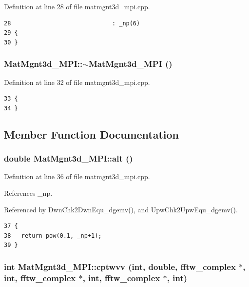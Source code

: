 Definition at line 28 of file matmgnt3d\_\-mpi.cpp.

\footnotesize\begin{verbatim}28                             : _np(6)
29 {
30 }
\end{verbatim}\normalsize 


\subsubsection{\setlength{\rightskip}{0pt plus 5cm}Mat\-Mgnt3d\_\-MPI::$\sim$Mat\-Mgnt3d\_\-MPI ()}\label{classMatMgnt3d__MPI_40388516ab24a5df90539a3b4513328f_40388516ab24a5df90539a3b4513328f}




Definition at line 32 of file matmgnt3d\_\-mpi.cpp.

\footnotesize\begin{verbatim}33 {
34 }
\end{verbatim}\normalsize 




\subsection{Member Function Documentation}
\subsubsection{\setlength{\rightskip}{0pt plus 5cm}double Mat\-Mgnt3d\_\-MPI::alt ()}\label{classMatMgnt3d__MPI_d3e453769e9e986f45d4fce5f3f4b9ad_d3e453769e9e986f45d4fce5f3f4b9ad}




Definition at line 36 of file matmgnt3d\_\-mpi.cpp.

References \_\-np.

Referenced by Dwn\-Chk2Dwn\-Equ\_\-dgemv(), and Upw\-Chk2Upw\-Equ\_\-dgemv().

\footnotesize\begin{verbatim}37 {
38   return pow(0.1, _np+1);
39 }
\end{verbatim}\normalsize 


\subsubsection{\setlength{\rightskip}{0pt plus 5cm}int Mat\-Mgnt3d\_\-MPI::cptwvv (int, double, fftw\_\-complex $\ast$, int, fftw\_\-complex $\ast$, int, fftw\_\-complex $\ast$, int)\hspace{0.3cm}{\tt  [inline]}}\label{classMatMgnt3d__MPI_a81bf8ce3d0c283d3bf63cae00ae99e6_a81bf8ce3d0c283d3bf63cae00ae99e6}




